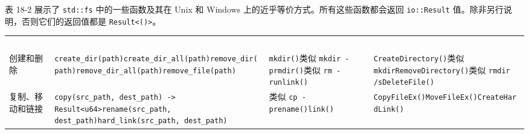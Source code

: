 表 18-2 展示了 \texttt{std::fs} 中的一些函数及其在 Unix 和 Windows 上的近乎等价方式。所有这些函数都会返回 \texttt{io::Result} 值。除非另行说明，否则它们的返回值都是 \texttt{Result<()>}。


\myTableBegin
\begin{tabularx}{\textwidth}{@{}>{\hsize=0.333\hsize\raggedright\arraybackslash}X>{\hsize=1.222\hsize\raggedright\arraybackslash}X>{\hsize=1.222\hsize\raggedright\arraybackslash}X>{\hsize=1.222\hsize\raggedright\arraybackslash}X@{}}
\rowcolor{tabhead}\textcolor{white}{} & \textcolor{white}{Rust 函数} & \textcolor{white}{Unix} & \textcolor{white}{Windows} \\
创建和删除 & \texttt{create\_dir(path)}\newline{}\texttt{create\_dir\_all(path)}\newline{}\texttt{remove\_dir(path)}\newline{}\texttt{remove\_dir\_all(path)}\newline{}\texttt{remove\_file(path)} & \texttt{mkdir()}\newline{}类似 \texttt{mkdir -p}\newline{}\texttt{rmdir()}\newline{}类似 \texttt{rm -r}\newline{}\texttt{unlink()} & \texttt{CreateDirectory()}\newline{}类似 \texttt{mkdir}\newline{}\texttt{RemoveDirectory()}\newline{}类似 \texttt{rmdir /s}\newline{}\texttt{DeleteFile()} \\
复制、移动和链接 & \texttt{copy(src\_path, dest\_path) -> Result<u64>}\newline{}\texttt{rename(src\_path, dest\_path)}\newline{}\texttt{hard\_link(src\_path, dest\_path)} & 类似 \texttt{cp -p}\newline{}\texttt{rename()}\newline{}\texttt{link()} & \texttt{CopyFileEx()}\newline{}\texttt{MoveFileEx()}\newline{}\texttt{CreateHardLink()} \\

\end{tabularx}
